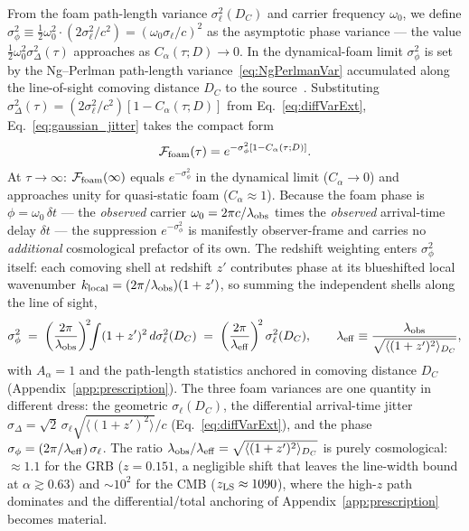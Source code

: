 \documentclass[aps,prd,onecolumn,amsmath,amssymb]{revtex4-2}
\begin{document}
From the foam path-length variance $\sigma_\ell^2(D_C)$ and carrier
frequency $\omega_0$, we define $\sigma_\phi^2 \equiv
\tfrac{1}{2}\omega_0^2\cdot(2\sigma_\ell^2/c^2) = (\omega_0\sigma_\ell/c)^2$
as the asymptotic phase variance --- the value
$\tfrac{1}{2}\omega_0^2\sigma_\Delta^2(\tau)$ approaches as
$C_\alpha(\tau;D)\to 0$.  In the dynamical-foam limit $\sigma_\phi^2$ is
set by the Ng--Perlman path-length variance~\eqref{eq:NgPerlmanVar}
accumulated along the line-of-sight comoving distance $D_C$ to the
source~\cite{NgPerlman2022}.  Substituting $\sigma_\Delta^2(\tau) =
(2\sigma_\ell^2/c^2)[1-C_\alpha(\tau;D)]$ from
Eq.~\eqref{eq:diffVarExt}, Eq.~\eqref{eq:gaussian_jitter} takes the compact form
\begin{equation}
  \mathcal{F}_{\rm foam}(\tau) = e^{-\sigma_\phi^2[1-C_\alpha(\tau;D)]}.
  \label{eq:Ffoam}
\end{equation}
At $\tau\to\infty$: $\mathcal{F}_{\rm foam}(\infty)$ equals
$e^{-\sigma_\phi^2}$ in the dynamical limit ($C_\alpha\to 0$) and
approaches unity for quasi-static foam ($C_\alpha\approx 1$).
Because the foam phase is $\phi=\omega_0\,\delta t$ --- the \emph{observed}
carrier $\omega_0=2\pi c/\lambda_{\rm obs}$ times the \emph{observed}
arrival-time delay $\delta t$ --- the suppression $e^{-\sigma_\phi^2}$ is
manifestly observer-frame and carries no \emph{additional} cosmological
prefactor of its own.  The redshift weighting enters $\sigma_\phi^2$ itself:
each comoving shell at redshift $z'$ contributes phase at its blueshifted local
wavenumber $k_{\rm local}=(2\pi/\lambda_{\rm obs})(1+z')$, so summing the
independent shells along the line of sight,
\begin{equation}
  \sigma_\phi^2
  \;=\; \left(\frac{2\pi}{\lambda_{\rm obs}}\right)^{\!2}\!\!
        \int (1+z')^2\,d\sigma_\ell^2(D_C)
  \;=\; \left(\frac{2\pi}{\lambda_{\rm eff}}\right)^{\!2}\sigma_\ell^2(D_C),
  \qquad
  \lambda_{\rm eff}\equiv\frac{\lambda_{\rm obs}}{\sqrt{\langle(1+z')^2\rangle_{D_C}}},
  \label{eq:sigmaphi_cosmo}
\end{equation}
with $A_\alpha=1$ and the path-length statistics anchored in comoving distance
$D_C$ (Appendix~\ref{app:prescription}).  The three foam variances are one
quantity in different dress: the geometric $\sigma_\ell(D_C)$, the differential
arrival-time jitter
$\sigma_\Delta=\sqrt{2}\,\sigma_\ell\sqrt{\langle(1+z')^2\rangle}/c$
(Eq.~\eqref{eq:diffVarExt}), and the phase
$\sigma_\phi=(2\pi/\lambda_{\rm eff})\,\sigma_\ell$.  The ratio
$\lambda_{\rm obs}/\lambda_{\rm eff}=\sqrt{\langle(1+z')^2\rangle_{D_C}}$ is
purely cosmological: $\approx1.1$ for the GRB ($z=0.151$, a negligible shift
that leaves the line-width bound at $\alpha\gtrsim0.63$) and $\sim10^{2}$ for
the CMB ($z_{\rm LS}\approx1090$), where the high-$z$ path dominates and the
differential/total anchoring of Appendix~\ref{app:prescription} becomes
material.
\end{document}
